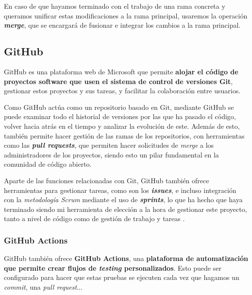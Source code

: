 En caso de que hayamos terminado con el trabajo de una rama concreta y queramos unificar estas modificaciones a la rama principal, usaremos la operación \textit{\textbf{merge}}, que se encargará de fusionar e integrar los cambios a la rama principal. \cite{git:git-basics}


\subsection{GitHub}

GitHub es una plataforma web de Microsoft que permite \textbf{alojar el código de proyectos software que usen el sistema de control de versiones Git}, gestionar estos proyectos y sus tareas, y facilitar la colaboración entre usuarios.


Como GitHub actúa como un repositorio basado en Git, mediante GitHub se puede examinar todo el historial de versiones por las que ha pasado el código, volver hacia atrás en el tiempo y analizar la evolución de este. Además de esto, también permite hacer gestión de las ramas de los repositorios, con herramientas como las \textit{\textbf{pull requests}}, que permiten hacer solicitudes de \textit{merge} a los administradores de los proyectos, siendo esto un pilar fundamental en la comunidad de código abierto.

Aparte de las funciones relacionadas con Git, GitHub también ofrece herramientas para gestionar tareas, como son los \textit{\textbf{issues}}, e incluso integración con la \textit{metodología Scrum} mediante el uso de \textit{\textbf{sprints}}, lo que ha hecho que haya terminado siendo mi herramienta de elección a la hora de gestionar este proyecto, tanto a nivel de código como de gestión de trabajo y tareas \cite{wikipedia:github}.

\subsubsection{GitHub Actions}

GitHub también ofrece \textbf{GitHub Actions}, una \textbf{plataforma de automatización que permite crear flujos de \textit{testing} personalizados}. Esto puede ser configurado para hacer que estas pruebas se ejecuten cada vez que hagamos un \textit{commit}, una \textit{pull request}... \cite{github-actions:docs}

